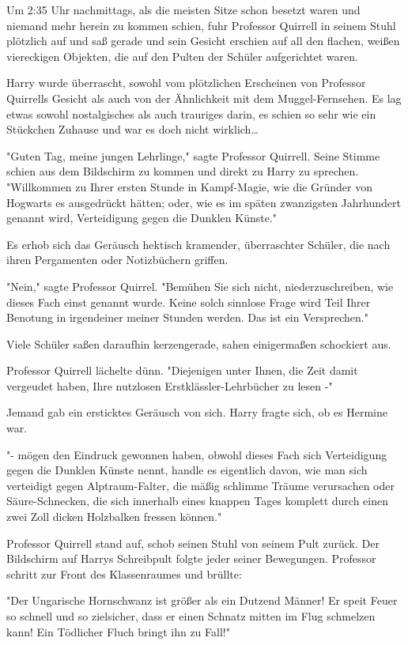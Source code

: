 {\later

Um 2:35 Uhr nachmittags, als die meisten Sitze schon besetzt waren und niemand mehr herein zu kommen schien, fuhr Professor Quirrell in seinem Stuhl plötzlich auf und saß gerade und sein Gesicht erschien auf all den flachen, weißen viereckigen Objekten, die auf den Pulten der Schüler aufgerichtet waren.

Harry wurde überrascht, sowohl vom plötzlichen Erscheinen von Professor Quirrells Gesicht als auch von der Ähnlichkeit mit dem Muggel-Fernsehen. Es lag etwas sowohl nostalgisches als auch trauriges darin, es schien so sehr wie ein Stückchen Zuhause und war es doch nicht wirklich…

"Guten Tag, meine jungen Lehrlinge," sagte Professor Quirrell. Seine Stimme schien aus dem Bildschirm zu kommen und direkt zu Harry zu sprechen. "Willkommen zu Ihrer ersten Stunde in Kampf-Magie, wie die Gründer von Hogwarts es ausgedrückt hätten; oder, wie es im späten zwanzigsten Jahrhundert genannt wird, Verteidigung gegen die Dunklen Künste."

Es erhob sich das Geräusch hektisch kramender, überraschter Schüler, die nach ihren Pergamenten oder Notizbüchern griffen.

"Nein," sagte Professor Quirrel. "Bemühen Sie sich nicht, niederzuschreiben, wie dieses Fach einst genannt wurde. Keine solch sinnlose Frage wird Teil Ihrer Benotung in irgendeiner meiner Stunden werden. Das ist ein Versprechen."

Viele Schüler saßen daraufhin kerzengerade, sahen einigermaßen schockiert aus.

Professor Quirrell lächelte dünn. "Diejenigen unter Ihnen, die Zeit damit vergeudet haben, Ihre nutzlosen Erstklässler-Lehrbücher zu lesen -"

Jemand gab ein ersticktes Geräusch von sich. Harry fragte sich, ob es Hermine war.

"- mögen den Eindruck gewonnen haben, obwohl dieses Fach sich Verteidigung gegen die Dunklen Künste nennt, handle es eigentlich davon, wie man sich verteidigt gegen Alptraum-Falter, die mäßig schlimme Träume verursachen oder Säure-Schnecken, die sich innerhalb eines knappen Tages komplett durch einen zwei Zoll dicken Holzbalken fressen können."

Professor Quirrell stand auf, schob seinen Stuhl von seinem Pult zurück. Der Bildschirm auf Harrys Schreibpult folgte jeder seiner Bewegungen. Professor schritt zur Front des Klassenraumes und brüllte:

"Der Ungarische Hornschwanz ist größer als ein Dutzend Männer! Er speit Feuer so schnell und so zielsicher, dass er einen Schnatz mitten im Flug schmelzen kann! Ein Tödlicher Fluch bringt ihn zu Fall!"

}
